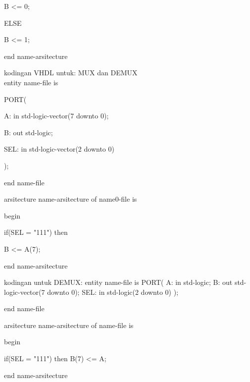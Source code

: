 \documentclass[12pt]{article}
\begin{document}
					B <= 0;
					
				ELSE
				
					B <= 1;
					
	end name-arsitecture
	
	\pagebreak
	kodingan VHDL untuk: MUX dan DEMUX \\
	
	entity name-file is
	
		PORT(
		
			A: in std-logic-vector(7 downto 0);
			
			B: out std-logic;
			
			SEL: in std-logic-vector(2 downto 0)
			
			);
			
	end name-file
	
	arsitecture name-arsitecture of name0-file is
	
		begin
		
			if(SEL = "111") then
			
				B <= A(7);
	
	end name-arsitecture
	
	kodingan untuk DEMUX:
	entity name-file is
		PORT(
			A: in std-logic;
			B: out std-logic-vector(7 downto 0);
			SEL: in std-logic(2 downto 0)
			);
		
	end name-file
	
	arsitecture name-arsitecture of name-file is
		
		begin
		
			if(SEL = "111") then
				B(7) <= A;		
		
	end name-arsitecture
\end{document}
